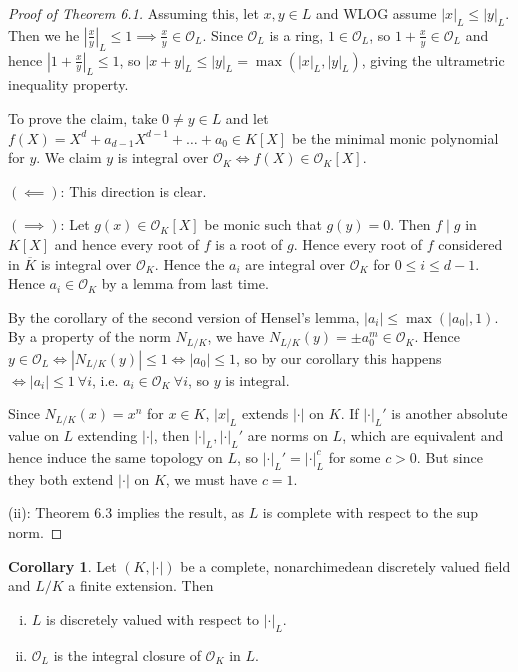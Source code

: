 \documentclass{article}
\theoremstyle{definition}
\newtheorem{cor}[theorem]{Corollary}
\begin{document}
\begin{proof}[Proof of Theorem 6.1]
    Assuming this, let $x, y \in L$ and WLOG assume $|x|_L \le |y|_L$. Then we he $\left|\frac{x}{y}\right|_L\le 1 \implies \frac{x}{y} \in \mathcal{O}_L$. Since $\mathcal{O}_L$ is a ring, $1 \in \mathcal{O}_L$, so $1 + \frac{x}{y} \in \mathcal{O}_L$ and hence $\left|1 +\frac{x}{y}\right|_L \le 1$, so $|x+y|_L \le |y|_L = \max (|x|_L, |y|_L)$, giving the ultrametric inequality property.

    
    To prove the claim, take $0 \neq y \in L$ and let $f(X) = X^d + a_{d-1}X^{d-1} + \ldots + a_0 \in K[X]$ be the minimal monic polynomial for $y$. We claim $y$ is integral over $\mathcal{O}_K \iff f(X) \in \mathcal{O}_K[X]$.
    \vspace{1mm}
     
    $(\impliedby)$: This direction is clear.
    \vspace{1mm}
     
    $(\implies )$: Let $g(x) \in \mathcal{O}_K[X]$ be monic such that $g(y)=0$. Then $f \mid g$ in $K[X]$ and hence every root of $f$ is a root of $g$. Hence every root of $f$ considered in $\overline{K}$ is integral over $\mathcal{O}_K$. Hence the $a_i$ are integral over $\mathcal{O}_K$ for $0\le i \le d-1$. Hence $a_i \in \mathcal{O}_K$ by a lemma from last time.
    \vspace{1mm}
     
    By the corollary of the second version of Hensel's lemma, $|a_i|\le \max(|a_0|,1)$. By a property of the norm $N_{L/K}$, we have $N_{L/K}(y) = \pm a_0^m \in \mathcal{O}_K$. Hence $y \in \mathcal{O}_L \iff |N_{L/K}(y)|\le 1 \iff |a_0|\le 1$, so by our corollary this happens $\iff |a_i|\le 1~\forall i$, i.e. $a_i \in \mathcal{O}_K ~\forall i$, so $y$ is integral.
    \vspace{1mm}
     
    Since $N_{L/K}(x)=x^n$ for $x \in K$, $|x|_L$ extends $|\cdot|$ on $K$. If $|\cdot|_L'$ is another absolute value on $L$ extending $|\cdot|$, then $|\cdot|_L, |\cdot|_L'$ are norms on $L$, which are equivalent and hence induce the same topology on $L$, so $|\cdot|_L' = |\cdot|_L^c$ for some $c>0$. But since they both extend $|\cdot|$ on $K$, we must have $c=1$.
    \vspace{1mm}
     
    (ii): Theorem 6.3 implies the result, as $L$ is complete with respect to the sup norm.
\end{proof}
\begin{cor}
    Let $(K,|\cdot|)$ be a complete, nonarchimedean discretely valued field and $L/K$ a finite extension. Then
    \begin{enumerate}[(i)]
        \item $L$ is discretely valued with respect to $|\cdot|_L$.
        \item $\mathcal{O}_L$ is the integral closure of $\mathcal{O}_K$ in $L$.
    \end{enumerate}
\end{cor}
\end{document}
